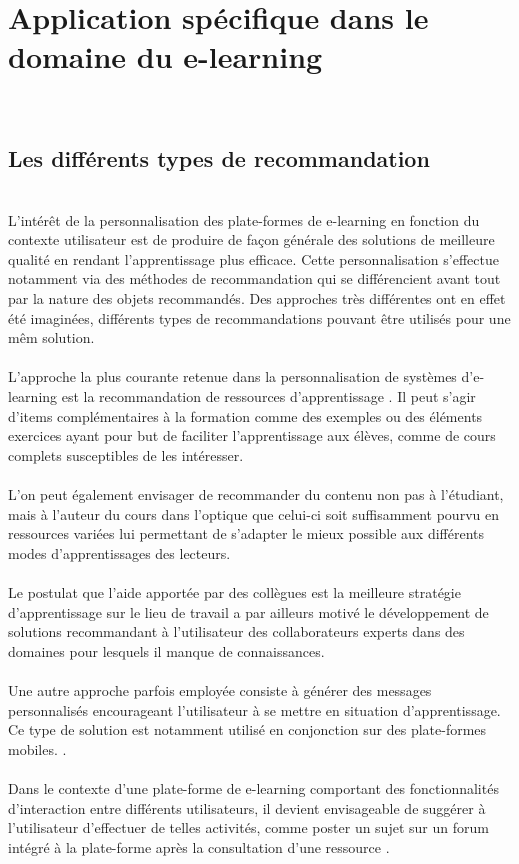 \documentclass[conference]{./sty/IEEEtran}
\begin{document}
\section{Application spécifique dans le domaine du e-learning}
~\\
\subsection{Les différents types de recommandation}
	~\\L'intérêt de la personnalisation des plate-formes de e-learning en fonction du contexte utilisateur est de produire de façon générale des solutions de meilleure qualité en rendant l'apprentissage plus efficace. Cette personnalisation s'effectue notamment via des méthodes de recommandation qui se différencient avant tout par la nature des objets recommandés. Des approches très différentes ont en effet été imaginées, différents types de recommandations pouvant être utilisés pour une mêm solution. \\
	~\\L'approche la plus courante retenue dans la personnalisation de systèmes d'e-learning est la recommandation de ressources d'apprentissage \cite{DBLP:journals/tlt/VerbertMOWDBD12}. Il peut s'agir d'items complémentaires à la formation comme des exemples ou des éléments exercices ayant pour but de faciliter l'apprentissage aux élèves, comme de cours complets susceptibles de les intéresser. \\
~\\L'on peut également envisager de recommander du contenu non pas à l'étudiant, mais à l'auteur du cours \cite{smartECourseRecommander} dans l'optique que celui-ci soit suffisamment pourvu en ressources variées lui permettant de s'adapter le mieux possible aux différents modes d'apprentissages des lecteurs. \\
~\\Le postulat que l'aide apportée par des collègues est la meilleure stratégie d'apprentissage sur le lieu de travail a par ailleurs motivé le développement de solutions recommandant à l'utilisateur des collaborateurs experts dans des domaines pour lesquels il manque de connaissances\cite{DBLP:journals/procedia/BehamKLL10}.\\
~\\Une autre approche parfois employée consiste à générer des messages personnalisés encourageant l'utilisateur à se mettre en situation d'apprentissage. Ce type de solution est notamment utilisé en conjonction sur des plate-formes mobiles. \cite{DBLP:conf/wmte/PetersenM06}. \\
~\\Dans le contexte d'une plate-forme de e-learning comportant des fonctionnalités d'interaction entre différents utilisateurs, il devient envisageable de suggérer à l'utilisateur d'effectuer de telles activités, comme poster un sujet sur un forum intégré à la plate-forme après la consultation d'une ressource \cite{Liou:2014:CPL:2617848.2617854}.
\end{document}

